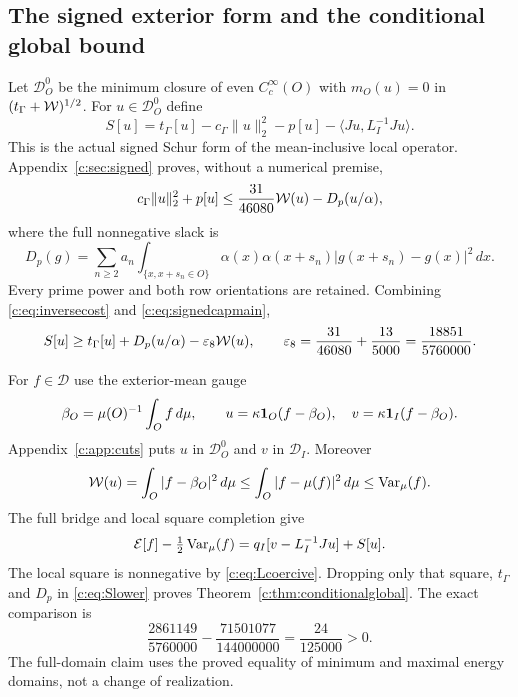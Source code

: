 \documentclass[11pt,a4paper]{article}
\numberwithin{equation}{section}
\theoremstyle{definition}\newtheorem{definition}[theorem]{Definition}
\theoremstyle{remark}\newtheorem{remark}[theorem]{Remark}
\newcommand{\E}{\mathcal E}\newcommand{\D}{\mathcal D}
\newcommand{\tg}{t_\Gamma}\newcommand{\cg}{c_\Gamma}
\newcommand{\ip}[2]{\langle#1,#2\rangle}\newcommand{\norm}[1]{\lVert#1\rVert}\newcommand{\abs}[1]{\lvert#1\rvert}
\begin{document}
\subsection{The signed exterior form and the conditional global bound}\label{c:sec:conditionalproof}
Let $\D_O^0$ be the minimum closure of even $C_c^\infty(O)$ with
$m_O(u)=0$ in $(\tg+\wo)^{1/2}$.
For $u\in\D_O^0$ define
\[
 S[u]=\tg[u]-\cg\norm u_2^2-p[u]-\ip{Ju}{L_I^{-1}Ju}.
\]
This is the actual signed Schur form of the mean-inclusive local operator.
Appendix~\ref{c:sec:signed} proves, without a numerical premise,
\begin{equation}\label{c:eq:signedcapmain}
 \cg\norm u_2^2+p[u]\le\frac{31}{46080}\wo(u)-D_p(u/\alpha),
\end{equation}
where the full nonnegative slack is
\[
 D_p(g)=\sum_{n\ge2}a_n\int_{\{x,x+s_n\in O\}}
  \alpha(x)\alpha(x+s_n)|g(x+s_n)-g(x)|^2\,dx.
\]
Every prime power and both row orientations are retained.
Combining \eqref{c:eq:inversecost} and \eqref{c:eq:signedcapmain},
\begin{equation}\label{c:eq:Slower}
 S[u]\ge\tg[u]+D_p(u/\alpha)-\varepsilon_8\wo(u),\qquad
 \varepsilon_8=\frac{31}{46080}+\frac{13}{5000}
 =\frac{18851}{5760000}.
\end{equation}

For $f\in\D$ use the exterior-mean gauge
\[
 \beta_O=\mu(O)^{-1}\int_Of\,d\mu,\qquad
 u=\kappa\mathbf1_O(f-\beta_O),\quad
 v=\kappa\mathbf1_I(f-\beta_O).
\]
Appendix~\ref{c:app:cuts} puts $u$ in $\D_O^0$ and $v$ in $\D_I$.
Moreover
\[
 \mathcal W(u)=\int_O|f-\beta_O|^2\,d\mu
 \le\int_O|f-\mu(f)|^2\,d\mu\le\operatorname{Var}_\mu(f).
\]
The full bridge and local square completion give
\begin{equation}\label{c:eq:squaremain}
 \E[f]-\tfrac12\Var_\mu(f)=q_I[v-L_I^{-1}Ju]+S[u].
\end{equation}
The local square is nonnegative by \eqref{c:eq:Lcoercive}.
Dropping only that square, $\tg$ and $D_p$ in \eqref{c:eq:Slower} proves
Theorem~\ref{c:thm:conditionalglobal}.
The exact comparison is
\[
 \frac{2861149}{5760000}-\frac{71501077}{144000000}
 =\frac{24}{125000}>0.
\]
The full-domain claim uses the proved equality of minimum and maximal energy domains, not a change of realization.
\end{document}
